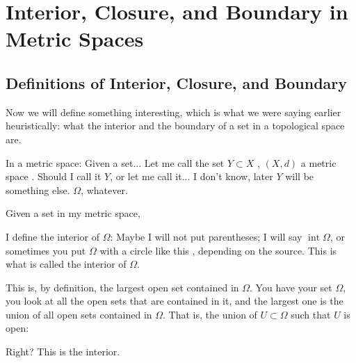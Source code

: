 \section{Interior, Closure, and Boundary in Metric Spaces}

\subsection{Definitions of Interior, Closure, and Boundary}

\begin{speech}[00:26:14 - 00:27:44]
Now we will define something interesting, which is what we were saying earlier heuristically: what the interior and the boundary of a set in a topological space are.

In a metric space:  Given a set... Let me call the set $Y \subset X$ , $(X, d)$ a metric space . Should I call it $Y$, or let me call it... I don't know, later $Y$ will be something else. $\Omega$, whatever. 

Given a set in my metric space,
\end{speech}

\begin{speech}[00:27:44 - 00:29:19]
I define the interior of $\Omega$:  Maybe I will not put parentheses; I will say $\operatorname{int} \Omega$, or sometimes you put $\Omega$ with a circle like this , depending on the source. This is what is called the interior of $\Omega$. 

This is, by definition, the largest open set contained in $\Omega$. You have your set $\Omega$, you look at all the open sets that are contained in it, and the largest one is the union of all open sets contained in $\Omega$. That is, the union of $U \subset \Omega$ such that $U$ is open: 

Right? This is the interior.
\end{speech}

